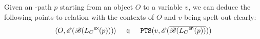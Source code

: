 \begin{comment}
Our CFL-reachability formulation
of \kcs{k}, defined by 
\capLFCR, discovers the points-to information in \pag as follows.
A path $p$ from $O$ to $v$ in \pag can be identified as a context-sensitive \flowsto relation iff $p$ is both (1) a $\flowsto$ path in \LF, where  $O\;\flowsto\; v$, (2) a realizable path in \LC, where 
$\realizable \Longrightarrow^* \mathcal{L}_C(p)$, and (3) a $W$ path in \LR, where $W \Longrightarrow^* \mathcal{L}_R(p)$, yielding the following
context-sensitive points-to relation:
\end{comment}

Given an \LFC-path  $p$ starting from an object $O$ to a variable $v$, we can deduce the following points-to relation with the contexts of $O$ and $v$ being spelt out clearly:
\begin{equation}
\label{eq:pt-ctx}
\begin{tabular}{@{}r@{\ }c@{\ }l@{}}
$\langle O,\RawCtxCheck{\BalParen{\LC^\exit(p)}}\rangle$ & $\quad\in \quad$  &
$\pointsto(v, \RawCtxHat{\overline{\BalParen{\LC^\entry(p)}}}
)$\\
\end{tabular}
\end{equation}

